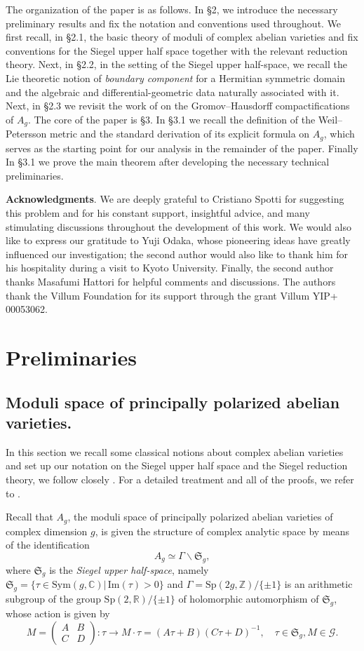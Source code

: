\documentclass[11pt]{amsart}
\theoremstyle{plain}
\theoremstyle{definition}
\theoremstyle{remark}
\newcommand{\C}{{\mathbb C}}
\newcommand{\R}{\mathbb R}
\newcommand{\Z}{\mathbb{Z}}
\newcommand{\fS}{\mathfrak{S}}
\newcommand{\im}{\mathrm{Im}}
\newcommand{\Sp}{\mathrm{Sp}}
\begin{document}
The organization of the paper is as follows. In \S2, we introduce the necessary preliminary results and fix the notation and conventions used throughout. We first recall, in \S2.1, the basic theory of moduli of complex abelian varieties and fix conventions for the Siegel upper half space together with the relevant reduction theory. Next, in \S2.2, in the setting of the Siegel upper half-space, we recall the Lie theoretic notion of \emph{boundary component} for a Hermitian symmetric domain and the algebraic and differential-geometric data naturally associated with it. Next, in \S2.3 we revisit the work of \cite{Odaka2019,OO2021} on the Gromov--Hausdorff compactifications of $A_g$. The core of the paper is \S3. In \S3.1 we recall the definition of the Weil--Petersson metric and the standard derivation of its explicit formula on $A_g$, which serves as the starting point for our analysis in the remainder of the paper. Finally In \S3.1 we prove the main theorem after developing the necessary technical preliminaries. 

\textbf{Acknowledgments}. We are deeply grateful to Cristiano Spotti for suggesting this problem and for his constant support, insightful advice, and many stimulating discussions throughout the development of this work. We would also like to express our gratitude to Yuji Odaka, whose pioneering ideas have greatly influenced our investigation; the second author would also like to thank him for his hospitality during a visit to Kyoto University. Finally, the second author thanks Masafumi Hattori for helpful comments and discussions. The authors thank the Villum Foundation for its support through the grant Villum YIP+ 00053062.

\section{Preliminaries}

\subsection{Moduli space of principally polarized abelian varieties.}
\label{mppav}
In this section we recall some classical notions about complex abelian varieties and set up our notation on the Siegel upper half space and the Siegel reduction theory, we follow closely \cite{Chai84}. For a detailed treatment and all of the proofs, we refer to \cite{Namikawa80, Hulek1993}.


Recall that $A_g$, the moduli space of principally polarized abelian varieties  of complex dimension $g$,  is given the structure of complex analytic space by means of the identification
\[
A_g\simeq\Gamma\backslash \fS_g,
\]
where $\fS_g$ is the \emph{Siegel upper half-space}, namely $\fS_g=\{\tau\in \mathrm{Sym}(g, \C)| \,\im(\tau)>0\}$ and $\Gamma=\Sp(2g,\Z)/\{\pm1\}$ is an arithmetic subgroup of the group $\Sp(2,\R)/\{\pm1\}$ of holomorphic automorphism of $\fS_g$, whose action is given by
\[
M=\begin{pmatrix}
    A&B\\
    C&D
\end{pmatrix}:\tau\to M\cdot\tau=(A\tau+B)(C\tau+D)^{-1}, \quad \tau\in\fS_g, M\in\mathcal{G}.
\]
\end{document}
